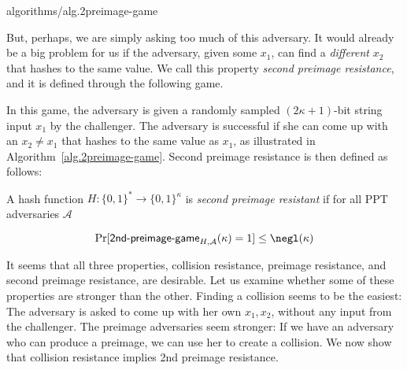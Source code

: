 {algorithms/alg.2preimage-game}

But, perhaps, we are simply asking too much of this adversary. It would already be a big problem
for us if the adversary, given some $x_1$, can find a \emph{different} $x_2$ that hashes to the same
value. We call this property \emph{second preimage resistance}, and it is defined through the following
game.

In this game, the adversary is given a randomly sampled $(2\kappa+1)$-bit string input $x_1$ by the challenger.
The adversary is successful if she can come up with an $x_2 \neq x_1$ that hashes to the same value as $x_1$,
as illustrated in Algorithm~\ref{alg.2preimage-game}.
Second preimage resistance is then defined as follows:

\begin{definition}
  A hash function $H: \{0, 1\}^* \longrightarrow \{0, 1\}^\kappa$ is \emph{second preimage resistant}
  if for all PPT adversaries $\mathcal{A}$

  \[
    \Pr[\textsf{2nd-preimage-game}_{H,\mathcal{A}}(\kappa) = 1] \leq \negl(\kappa)
  \]
\end{definition}

It seems that all three properties, collision resistance, preimage resistance, and second preimage
resistance, are desirable. Let us examine whether some of these properties are stronger than the other.
Finding a collision seems to be the easiest: The adversary is asked to come up with her own $x_1, x_2$,
without any input from the challenger. The preimage adversaries seem stronger: If we have
an adversary who can produce a preimage, we can use her to create a collision.
We now show that collision resistance implies 2nd preimage resistance.


